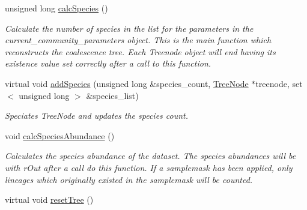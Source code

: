 \begin{DoxyCompactItemize}
unsigned long \hyperlink{group___community_objects_a241f69d1f69e61fc53c112fd874bf3ba}{calc\+Species} ()
\begin{DoxyCompactList}\small\item\em Calculate the number of species in the list for the parameters in the current\+\_\+community\+\_\+parameters object. This is the main function which reconstructs the coalescence tree. Each Treenode object will end having its existence value set correctly after a call to this function. \end{DoxyCompactList}\item 
virtual void \hyperlink{group___community_objects_a7a51d163ec40883125fde38e6e85e52e}{add\+Species} (unsigned long \&species\+\_\+count, \hyperlink{class_tree_node}{Tree\+Node} $\ast$treenode, set$<$ unsigned long $>$ \&species\+\_\+list)
\begin{DoxyCompactList}\small\item\em Speciates Tree\+Node and updates the species count. \end{DoxyCompactList}\item 
void \hyperlink{group___community_objects_a502a409a75567d78575625346b6a969f}{calc\+Species\+Abundance} ()\hypertarget{group___community_objects_a502a409a75567d78575625346b6a969f}{}\label{group___community_objects_a502a409a75567d78575625346b6a969f}

\begin{DoxyCompactList}\small\item\em Calculates the species abundance of the dataset. The species abundances will be with r\+Out after a call do this function. If a samplemask has been applied, only lineages which originally existed in the samplemask will be counted. \end{DoxyCompactList}\item 
virtual void \hyperlink{group___community_objects_abd099aacb5332a9b89b3421e01269d24}{reset\+Tree} ()\hypertarget{group___community_objects_abd099aacb5332a9b89b3421e01269d24}{}\label{group___community_objects_abd099aacb5332a9b89b3421e01269d24}


\end{DoxyCompactItemize}
